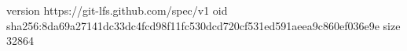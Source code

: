 version https://git-lfs.github.com/spec/v1
oid sha256:8da69a27141dc33dc4fcd98f11fc530dcd720cf531ed591aeea9c860ef036e9e
size 32864

